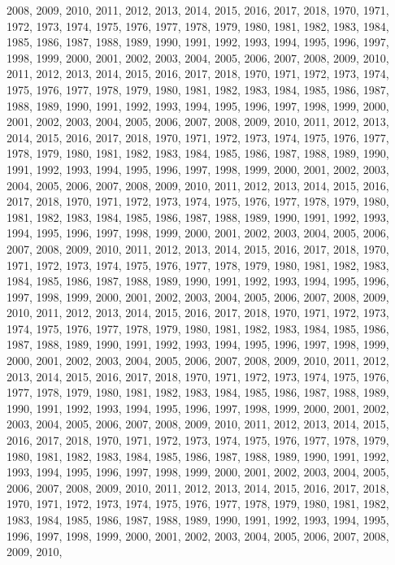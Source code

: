 \documentclass[
]{article}
\begin{document}
2008, 2009, 2010, 2011, 2012, 2013, 2014, 2015, 2016, 2017, 2018, 1970,
1971, 1972, 1973, 1974, 1975, 1976, 1977, 1978, 1979, 1980, 1981, 1982,
1983, 1984, 1985, 1986, 1987, 1988, 1989, 1990, 1991, 1992, 1993, 1994,
1995, 1996, 1997, 1998, 1999, 2000, 2001, 2002, 2003, 2004, 2005, 2006,
2007, 2008, 2009, 2010, 2011, 2012, 2013, 2014, 2015, 2016, 2017, 2018,
1970, 1971, 1972, 1973, 1974, 1975, 1976, 1977, 1978, 1979, 1980, 1981,
1982, 1983, 1984, 1985, 1986, 1987, 1988, 1989, 1990, 1991, 1992, 1993,
1994, 1995, 1996, 1997, 1998, 1999, 2000, 2001, 2002, 2003, 2004, 2005,
2006, 2007, 2008, 2009, 2010, 2011, 2012, 2013, 2014, 2015, 2016, 2017,
2018, 1970, 1971, 1972, 1973, 1974, 1975, 1976, 1977, 1978, 1979, 1980,
1981, 1982, 1983, 1984, 1985, 1986, 1987, 1988, 1989, 1990, 1991, 1992,
1993, 1994, 1995, 1996, 1997, 1998, 1999, 2000, 2001, 2002, 2003, 2004,
2005, 2006, 2007, 2008, 2009, 2010, 2011, 2012, 2013, 2014, 2015, 2016,
2017, 2018, 1970, 1971, 1972, 1973, 1974, 1975, 1976, 1977, 1978, 1979,
1980, 1981, 1982, 1983, 1984, 1985, 1986, 1987, 1988, 1989, 1990, 1991,
1992, 1993, 1994, 1995, 1996, 1997, 1998, 1999, 2000, 2001, 2002, 2003,
2004, 2005, 2006, 2007, 2008, 2009, 2010, 2011, 2012, 2013, 2014, 2015,
2016, 2017, 2018, 1970, 1971, 1972, 1973, 1974, 1975, 1976, 1977, 1978,
1979, 1980, 1981, 1982, 1983, 1984, 1985, 1986, 1987, 1988, 1989, 1990,
1991, 1992, 1993, 1994, 1995, 1996, 1997, 1998, 1999, 2000, 2001, 2002,
2003, 2004, 2005, 2006, 2007, 2008, 2009, 2010, 2011, 2012, 2013, 2014,
2015, 2016, 2017, 2018, 1970, 1971, 1972, 1973, 1974, 1975, 1976, 1977,
1978, 1979, 1980, 1981, 1982, 1983, 1984, 1985, 1986, 1987, 1988, 1989,
1990, 1991, 1992, 1993, 1994, 1995, 1996, 1997, 1998, 1999, 2000, 2001,
2002, 2003, 2004, 2005, 2006, 2007, 2008, 2009, 2010, 2011, 2012, 2013,
2014, 2015, 2016, 2017, 2018, 1970, 1971, 1972, 1973, 1974, 1975, 1976,
1977, 1978, 1979, 1980, 1981, 1982, 1983, 1984, 1985, 1986, 1987, 1988,
1989, 1990, 1991, 1992, 1993, 1994, 1995, 1996, 1997, 1998, 1999, 2000,
2001, 2002, 2003, 2004, 2005, 2006, 2007, 2008, 2009, 2010, 2011, 2012,
2013, 2014, 2015, 2016, 2017, 2018, 1970, 1971, 1972, 1973, 1974, 1975,
1976, 1977, 1978, 1979, 1980, 1981, 1982, 1983, 1984, 1985, 1986, 1987,
1988, 1989, 1990, 1991, 1992, 1993, 1994, 1995, 1996, 1997, 1998, 1999,
2000, 2001, 2002, 2003, 2004, 2005, 2006, 2007, 2008, 2009, 2010, 2011,
2012, 2013, 2014, 2015, 2016, 2017, 2018, 1970, 1971, 1972, 1973, 1974,
1975, 1976, 1977, 1978, 1979, 1980, 1981, 1982, 1983, 1984, 1985, 1986,
1987, 1988, 1989, 1990, 1991, 1992, 1993, 1994, 1995, 1996, 1997, 1998,
1999, 2000, 2001, 2002, 2003, 2004, 2005, 2006, 2007, 2008, 2009, 2010,
\end{document}
